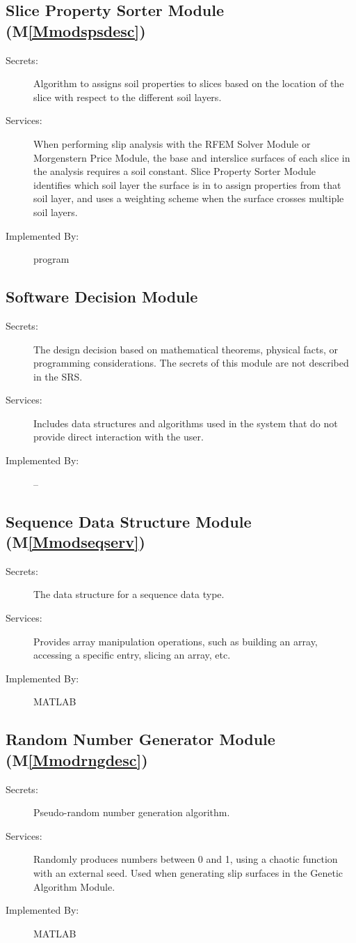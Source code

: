 \documentclass[12pt]{article}
\begin{document}
\subsection{Slice Property Sorter Module (M\ref{Mmodspsdesc})}
\label{Sec:SPSM()}
\begin{description}
\item[Secrets:]Algorithm to assigns soil properties to slices based on the location of the slice with respect to the different soil layers.
\item[Services:]When performing slip analysis with the RFEM Solver Module or Morgenstern Price Module, the base and interslice surfaces of each slice in the analysis requires a soil constant. Slice Property Sorter Module identifies which soil layer the surface is in to assign properties from that soil layer, and uses a weighting scheme when the surface crosses multiple soil layers.
\item[Implemented By:]program
\end{description}
\subsection{Software Decision Module}
\label{Sec:SDM}
\begin{description}
\item[Secrets:]The design decision based on mathematical theorems, physical facts, or programming considerations. The secrets of this module are not described in the SRS.
\item[Services:]Includes data structures and algorithms used in the system that do not provide direct interaction with the user.
\item[Implemented By:]--
\end{description}
\subsection{Sequence Data Structure Module (M\ref{Mmodseqserv})}
\label{Sec:SDSM()}
\begin{description}
\item[Secrets:]The data structure for a sequence data type.
\item[Services:]Provides array manipulation operations, such as building an array, accessing a specific entry, slicing an array, etc.
\item[Implemented By:]MATLAB
\end{description}
\subsection{Random Number Generator Module (M\ref{Mmodrngdesc})}
\label{Sec:RNGM()}
\begin{description}
\item[Secrets:]Pseudo-random number generation algorithm.
\item[Services:]Randomly produces numbers between 0 and 1, using a chaotic function with an external seed. Used when generating slip surfaces in the Genetic Algorithm Module.
\item[Implemented By:]MATLAB
\end{description}
\end{document}
